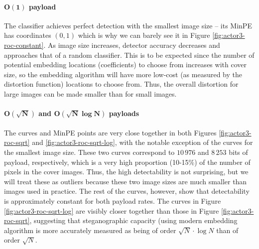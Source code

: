 \documentclass[11pt,a4paper,twoside,openright]{report}
\begin{document}
\paragraph{$\bm{O(1)}$ payload} The classifier achieves perfect detection with the smallest image size -- its MinPE has coordinates $(0,1)$ which is why we can barely see it in Figure \ref{fig:actor3-roc-constant}. As image size increases, detector accuracy decreases and approaches that of a random classifier. This is to be expected since the number of potential embedding locations (coefficients) to choose from increases with cover size, so the embedding algorithm will have more low-cost (as measured by the distortion function) locations to choose from. Thus, the overall distortion for large images can be made smaller than for small images.

\paragraph{$\bm{O(\sqrt{N})}$ and $\bm{O(\sqrt{N} \log{N})}$ payloads} The curves and MinPE points are very close together in both Figures \ref{fig:actor3-roc-sqrt} and \ref{fig:actor3-roc-sqrt-log}, with the notable exception of the curves for the smallest image size. These two curves correspond to $10\,976$ and $8\,253$ bits of payload, respectively, which is a very high proportion (10-15\%) of the number of pixels in the cover images. Thus, the high detectability is not surprising, but we will treat these as outliers because these two image sizes are much smaller than images used in practice. The rest of the curves, however, show that detectability is approximately constant for both payload rates. The curves in Figure \ref{fig:actor3-roc-sqrt-log} are visibly closer together than those in Figure \ref{fig:actor3-roc-sqrt}, suggesting that steganographic capacity (using modern embedding algorithm
is more accurately measured as being of order $\sqrt{N} \cdot \log{N}$ than of order $\sqrt{N}$.
\end{document}
